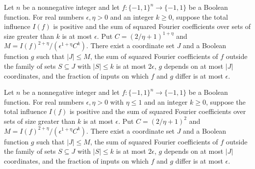 \begin{theorem}
\label{FABL.improvedFriedgut_exists_close_junta_general}
\leanok
{}
Let $n$ be a nonnegative integer and let $f:\{-1,1\}^n\to\{-1,1\}$ be a Boolean
function. For real numbers $\epsilon,\eta>0$ and an integer $k\ge0$, suppose the total
influence $I(f)$ is positive and the sum of squared Fourier coefficients over sets of
size greater than $k$ is at most $\epsilon$. Put $C=(2/\eta+1)^{1+\eta}$ and
$M=I(f)^{2+\eta}/(\epsilon^{1+\eta}C^k)$. There exist a coordinate set $J$ and a Boolean
function $g$ such that $|J|\le M$, the sum of squared Fourier coefficients of $f$
outside the family of sets $S\subseteq J$ with $|S|\le k$ is at most $2\epsilon$, $g$
depends on at most $|J|$ coordinates, and the fraction of inputs on which $f$ and $g$
differ is at most $\epsilon$.
\end{theorem}

\begin{theorem}
\label{FABL.improvedFriedgut_exists_close_junta}
\leanok
{}
Let $n$ be a nonnegative integer and let $f:\{-1,1\}^n\to\{-1,1\}$ be a Boolean
function. For real numbers $\epsilon,\eta>0$ with $\eta\le1$ and an integer $k\ge0$,
suppose the total influence $I(f)$ is positive and the sum of squared Fourier
coefficients over sets of size greater than $k$ is at most $\epsilon$. Put
$C=(2/\eta+1)^2$ and $M=I(f)^{2+\eta}/(\epsilon^{1+\eta}C^k)$. There exist a coordinate
set $J$ and a Boolean function $g$ such that $|J|\le M$, the sum of squared Fourier
coefficients of $f$ outside the family of sets $S\subseteq J$ with $|S|\le k$ is at most
$2\epsilon$, $g$ depends on at most $|J|$ coordinates, and the fraction of inputs on
which $f$ and $g$ differ is at most $\epsilon$.
\end{theorem}

